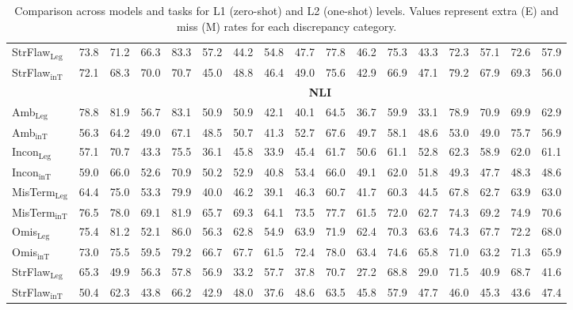 \documentclass[11pt]{article}
\begin{document}
\begin{table}[h!]
\begin{tabular}{l|cccc|cccc|cccc|cccc}
StrFlaw$_{\text{Leg}}$ & 73.8 & 71.2 & 66.3 & 83.3 & 57.2 & 44.2 & 54.8 & 47.7 & 77.8 & 46.2 & 75.3 & 43.3 & 72.3 & 57.1 & 72.6 & 57.9 \\
StrFlaw$_{\text{inT}}$ & 72.1 & 68.3 & 70.0 & 70.7 & 45.0 & 48.8 & 46.4 & 49.0 & 75.6 & 42.9 & 66.9 & 47.1 & 79.2 & 67.9 & 69.3 & 56.0 \\
\cmidrule{1-17}
\rowcolor{lightestgray}
\cellcolor{white} & \multicolumn{16}{c}{\textbf{NLI}} \\
Amb$_{\text{Leg}}$ & 78.8 & 81.9 & 56.7 & 83.1 & 50.9 & 50.9 & 42.1 & 40.1 & 64.5 & 36.7 & 59.9 & 33.1 & 78.9 & 70.9 & 69.9 & 62.9 \\
Amb$_{\text{inT}}$ & 56.3 & 64.2 & 49.0 & 67.1 & 48.5 & 50.7 & 41.3 & 52.7 & 67.6 & 49.7 & 58.1 & 48.6 & 53.0 & 49.0 & 75.7 & 56.9 \\
Incon$_{\text{Leg}}$ & 57.1 & 70.7 & 43.3 & 75.5 & 36.1 & 45.8 & 33.9 & 45.4 & 61.7 & 50.6 & 61.1 & 52.8 & 62.3 & 58.9 & 62.0 & 61.1 \\
Incon$_{\text{inT}}$ & 59.0 & 66.0 & 52.6 & 70.9 & 50.2 & 52.9 & 40.8 & 53.4 & 66.0 & 49.1 & 62.0 & 51.8 & 49.3 & 47.7 & 48.3 & 48.6 \\
MisTerm$_{\text{Leg}}$ & 64.4 & 75.0 & 53.3 & 79.9 & 40.0 & 46.2 & 39.1 & 46.3 & 60.7 & 41.7 & 60.3 & 44.5 & 67.8 & 62.7 & 63.9 & 63.0 \\
MisTerm$_{\text{inT}}$ & 76.5 & 78.0 & 69.1 & 81.9 & 65.7 & 69.3 & 64.1 & 73.5 & 77.7 & 61.5 & 72.0 & 62.7 & 74.3 & 69.2 & 74.9 & 70.6 \\
Omis$_{\text{Leg}}$ & 75.4 & 81.2 & 52.1 & 86.0 & 56.3 & 62.8 & 54.9 & 63.9 & 71.9 & 62.4 & 70.3 & 63.6 & 74.3 & 67.7 & 72.2 & 68.0 \\
Omis$_{\text{inT}}$ & 73.0 & 75.5 & 59.5 & 79.2 & 66.7 & 67.7 & 61.5 & 72.4 & 78.0 & 63.4 & 74.6 & 65.8 & 71.0 & 63.2 & 71.3 & 65.9 \\
StrFlaw$_{\text{Leg}}$ & 65.3 & 49.9 & 56.3 & 57.8 & 56.9 & 33.2 & 57.7 & 37.8 & 70.7 & 27.2 & 68.8 & 29.0 & 71.5 & 40.9 & 68.7 & 41.6 \\
StrFlaw$_{\text{inT}}$ & 50.4 & 62.3 & 43.8 & 66.2 & 42.9 & 48.0 & 37.6 & 48.6 & 63.5 & 45.8 & 57.9 & 47.7 & 46.0 & 45.3 & 43.6 & 47.4 \\
\hline
\end{tabular}
\caption{\small Comparison across models and tasks for L1 (zero-shot) and L2 (one-shot) levels. Values represent extra (E) and miss (M) rates for each discrepancy category.}
\label{tab:category_values}
\end{table}
\end{document}
